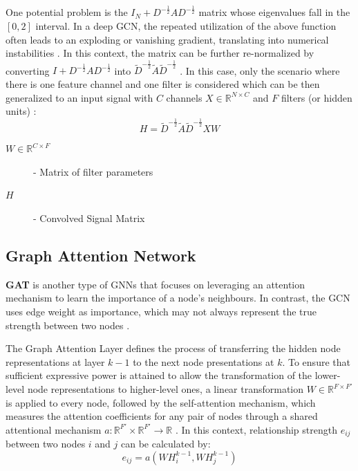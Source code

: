 One potential problem is the $I_N + D^{-\frac{1}{2}} AD^{-\frac{1}{2}}$ matrix whose eigenvalues fall in the $[0,2]$ interval. In a deep \ac{GCN}, the repeated utilization of the above function often leads to an exploding or vanishing gradient, translating into numerical instabilities \cite{liuIntroductionGraphNeural2020, tangGraphNeuralNetworks2022}. In this context, the matrix can be further re-normalized by converting $I + D^{-\frac{1}{2}} AD^{-\frac{1}{2}}$ into $\tilde{D}^{-\frac{1}{2}} \tilde{A}\tilde{D}^{-\frac{1}{2}}$ \cite{liuIntroductionGraphNeural2020, tangGraphNeuralNetworks2022}. 
In this case, only the scenario where there is one feature channel and one filter is considered which can be then generalized to an input signal with $C$ channels $X \in \mathbb{R}^{N \times C}$ and $F$ filters (or hidden units) \cite{liuIntroductionGraphNeural2020, tangGraphNeuralNetworks2022}:
\begin{equation}
	H = \tilde{D}^{-\frac{1}{2}} \tilde{A}\tilde{D}^{-\frac{1}{2}}XW    
\end{equation}

\begin{description}
	\item[$W \in \mathbb{R}^{C \times F}$] - Matrix of filter parameters
	\item[$H$] - Convolved Signal Matrix
\end{description}


\subsection{Graph Attention Network}

\textbf{\ac{GAT}} \cite{velickovicGraphAttentionNetworks2018} is another type of \acp{GNN} that focuses on leveraging an attention mechanism to learn the importance of a node's neighbours. In contrast, the \ac{GCN} uses edge weight as importance, which may not always represent the true strength between two nodes \cite{tangGraphNeuralNetworks2022, velickovicGraphAttentionNetworks2018}.

The Graph Attention Layer defines the process of transferring the hidden node representations at layer $k - 1$ to the next node presentations at $k$. To ensure that sufficient expressive power is attained to allow the transformation of the lower-level node representations to higher-level ones, a linear transformation $W \in \mathbb{R}^{F \times F'}$ is applied to every node, followed by the self-attention mechanism, which measures the attention coefficients for any pair of nodes through a shared attentional mechanism $a: \mathbb{R}^{F'} \times \mathbb{R}^{F'} \rightarrow \mathbb{R}$ \cite{tangGraphNeuralNetworks2022, velickovicGraphAttentionNetworks2018}. In this context, relationship strength $e_{ij}$ between two nodes $i$ and $j$ can be calculated by:
\begin{equation}
	e_{ij} = a(W H^{k - 1}_i, W H^{k - 1}_j)
\end{equation}

